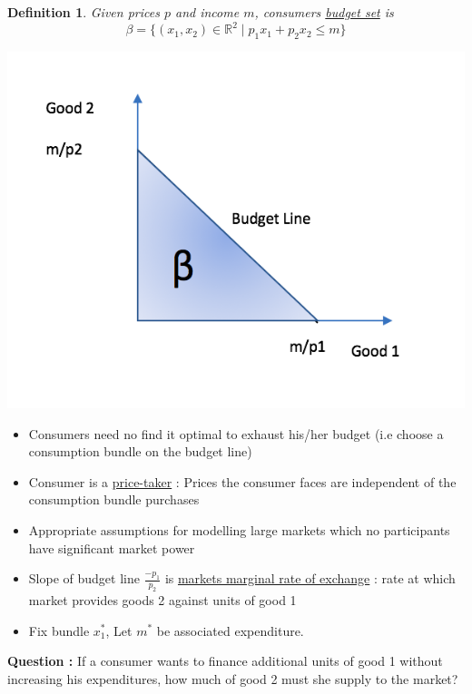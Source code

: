 \documentclass[twoside]{article}
\newtheorem{definition}[theorem]{Definition}
\begin{document}
\begin{definition}
Given prices \(p\) and income \(m\), consumers \underline{budget set} is \[\beta = \{ (x_1, x_2) \in \mathbb{R}^2 \mid p_1 x_1 + p_2 x_2 \leq m \}\]
\end{definition}

\begin{center}
\includegraphics[scale=0.6]{2}
\end{center}

\begin{itemize}
\item Consumers need no find it optimal to exhaust his/her budget (i.e choose a consumption bundle on the budget line) 
\item Consumer is a \underline{price-taker} : Prices the consumer faces are independent of the consumption bundle  purchases
\item Appropriate assumptions for modelling large markets which no participants have significant market power
\item Slope of budget line \(\frac{-p_1}{p_2}\) is \underline{markets marginal rate of exchange} : rate at which market provides goods 2 against units of good 1
\end{itemize}

\begin{itemize}
\item Fix bundle \(x_1^*\), Let \(m^*\) be associated expenditure. 
\end{itemize}

\textbf{Question : } If a consumer wants to finance additional units of good 1 without increasing his expenditures, how much of good 2 must she supply to the market? 
\end{document}
